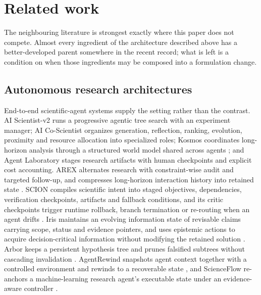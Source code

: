 \section{Related work}
\label{sec:relatedwork}

The neighbouring literature is strongest exactly where this paper does not
compete. Almost every ingredient of the architecture described above has a
better-developed parent somewhere in the recent record; what is left is a
condition on when those ingredients may be composed into a formulation change.

\subsection{Autonomous research architectures}

End-to-end scientific-agent systems supply the setting rather than the contrast.
AI Scientist-v2 runs a progressive agentic tree search with an experiment
manager; AI Co-Scientist organizes generation, reflection, ranking, evolution,
proximity and resource allocation into specialized roles; Kosmos coordinates
long-horizon analysis through a structured world model shared across agents
\cite{kosmos2025}; and Agent Laboratory stages research artifacts with human
checkpoints and explicit cost accounting. AREX alternates research with
constraint-wise audit and targeted follow-up, and compresses long-horizon
interaction history into retained state \cite{arex2026}. SCION compiles
scientific intent into staged objectives, dependencies, verification checkpoints,
artifacts and fallback conditions, and its critic checkpoints trigger runtime
rollback, branch termination or re-routing when an agent drifts
\cite{scion2026}. Iris maintains an evolving information state of revisable
claims carrying scope, status and evidence pointers, and uses epistemic actions
to acquire decision-critical information without modifying the retained solution
\cite{iris2026}. Arbor keeps a persistent hypothesis tree and prunes falsified
subtrees without cascading invalidation \cite{arbor2026}. AgentRewind snapshots
agent context together with a controlled environment and rewinds to a
recoverable state \cite{agentrewind2026}, and ScienceFlow re-anchors a
machine-learning research agent's executable state under an evidence-aware
controller \cite{scienceflow2026}.

